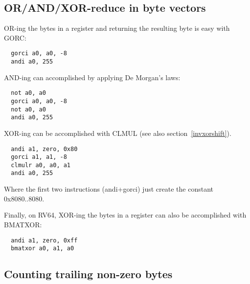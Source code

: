 
\subsection{OR/AND/XOR-reduce in byte vectors}

OR-ing the bytes in a register and returning the resulting byte is
easy with GORC:

\begin{minipage}{\linewidth}
\begin{verbatim}
  gorci a0, a0, -8
  andi a0, 255
\end{verbatim}
\end{minipage}

AND-ing can accomplished by applying De Morgan's laws:

\begin{minipage}{\linewidth}
\begin{verbatim}
  not a0, a0
  gorci a0, a0, -8
  not a0, a0
  andi a0, 255
\end{verbatim}
\end{minipage}

XOR-ing can be accomplished with CLMUL (see also section~\ref{invxorshift}).

\begin{minipage}{\linewidth}
\begin{verbatim}
  andi a1, zero, 0x80
  gorci a1, a1, -8
  clmulr a0, a0, a1
  andi a0, 255
\end{verbatim}
\end{minipage}

Where the first two instructions (andi+gorci) just create the constant 0x8080..8080.

Finally, on RV64, XOR-ing the bytes in a register can also be accomplished with BMATXOR:

\begin{minipage}{\linewidth}
\begin{verbatim}
  andi a1, zero, 0xff
  bmatxor a0, a1, a0
\end{verbatim}
\end{minipage}


\subsection{Counting trailing non-zero bytes}

